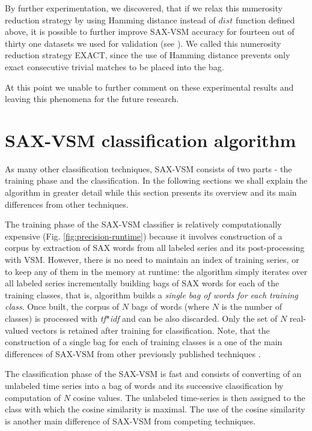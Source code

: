 \documentclass{llncs}
\begin{document}
By further experimentation, we discovered, that if we relax this numerosity reduction
strategy by using Hamming distance \cite{hamming} instead of $dist$ function
defined above, it is possible to further improve SAX-VSM accuracy for fourteen 
out of thirty one datasets we used for validation (see \cite{jmotif}). 
We called this numerosity reduction strategy EXACT, since the use of Hamming 
distance prevents only exact consecutive trivial matches to be placed into the bag. 

At this point we unable to further comment on these experimental results and 
leaving this phenomena for the future research.

\section{SAX-VSM classification algorithm }
As many other classification techniques, SAX-VSM consists of two parts - the training phase 
and the classification. In the following sections we shall explain the algorithm in greater detail 
while this section presents its overview and its main differences from other techniques.

The training phase of the SAX-VSM classifier is relatively computationally expensive 
(Fig. \ref{fig:precision-runtime}) because it involves construction of a corpus by
extraction of SAX words from all labeled series and its post-processing with VSM. 
However, there is no need to maintain an index of training series, or to keep any of 
them in the memory at runtime: the algorithm simply iterates over all labeled series
incrementally building bags of SAX words for each of the training classes, 
that is, algorithm builds a \textit{single bag of words for each training class}. 
Once built, the corpus of $N$ bags of words (where $N$ is the number of classes) is
processed with \textit{tf$\ast$idf} and can be also discarded. 
Only the set of $N$ real-valued vectors is retained after training for classification. 
Note, that the construction of a single bag for each of training classes is a one 
of the main differences of SAX-VSM from other previously published 
techniques \cite{bag_patterns}.

The classification phase of the SAX-VSM is fast and consists of converting of an 
unlabeled time series into a bag of words and its successive classification by 
computation of $N$ cosine values. The unlabeled time-series is then assigned to 
the class with which the cosine similarity is maximal. The use of the cosine 
similarity is another main difference of SAX-VSM from competing techniques.
\end{document}
